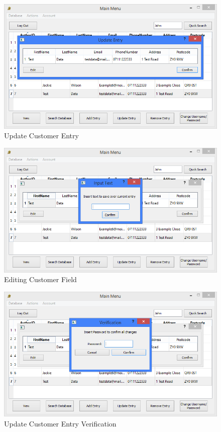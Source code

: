 \begin{figure}[H]
    \caption{Update Customer Entry} \label{fig:UpdateEntry}
    \includegraphics[width=\textwidth]{./Maintenance/UserInterface/UpdateEntry.png}
\end{figure}

\begin{figure}[H]
    \caption{Editing Customer Field} \label{fig:EditingEntry}
    \includegraphics[width=\textwidth]{./Maintenance/UserInterface/EditingEntry.png}
\end{figure}

\begin{figure}[H]
    \caption{Update Customer Entry Verification} \label{fig:UpdateEntryVerify}
    \includegraphics[width=\textwidth]{./Maintenance/UserInterface/UpdateEntryVerify.png}
\end{figure}

